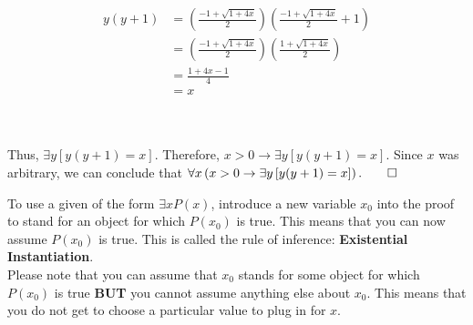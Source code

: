 \documentclass[../setup.tex]{subfiles}
\begin{document}
\begin{center}
	\begin{align*}
		y(y + 1) &= \left(\frac{-1 + \sqrt{1 + 4x}}{2}\right) \left(\frac{-1 + \sqrt{1 + 4x}}{2} + 1\right) \\
		&= \left(\frac{-1 + \sqrt{1 + 4x}}{2}\right) \left(\frac{1 + \sqrt{1 + 4x}}{2}\right) \\
		&= \frac{1 + 4x -1}{4} \\
		&= x
	\end{align*}
\end{center}
\phantom \\ \\
Thus, $\exists{y}\left[y(y+1) = x\right]$. Therefore, $x > 0 \rightarrow \exists{y}\left[y(y+1) = x\right]$. Since $x$ was arbitrary, we can conclude that $\forall{x}\left(x > 0 \rightarrow \exists{y}\left[y(y+1) = x\right]\right). \qed$

\begin{theorem}
	To use a given of the form $\exists{x}P(x)$, introduce a new variable $x_0$ into the proof to stand for an object for which $P(x_0)$ is true. This means that you can now assume $P(x_0)$ is true. This is called the rule of inference: \textbf{Existential Instantiation}. \\
	Please note that you can assume that $x_0$ stands for some object for which $P(x_0)$ is true \textbf{BUT} you cannot assume anything else about $x_0$. This means that you do not get to choose a particular value to plug in for $x$.
\end{theorem}
\end{document}
